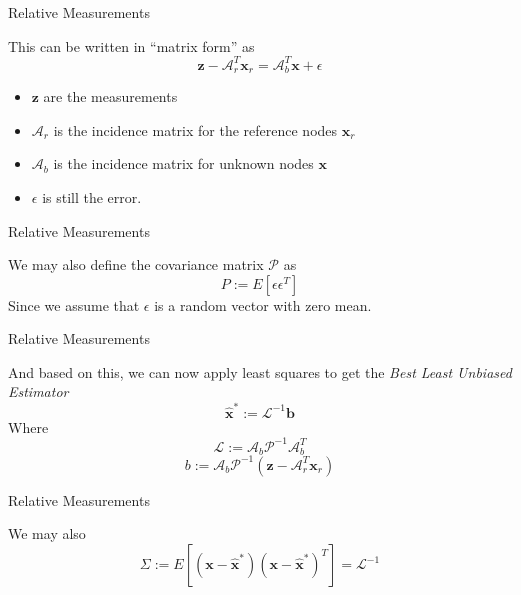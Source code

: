 \documentclass{beamer}
\begin{document}
\begin{frame}{Relative Measurements}
\begin{center}
This can be written in ``matrix form'' as
\[ \mathbf{z} - \mathcal{A}_r^T\mathbf{x}_r = \mathcal{A}_b^T \mathbf{x} +
 \epsilon \]
 \begin{itemize}
 \item $\mathbf{z}$ are the measurements
 \item $\mathcal{A}_r$ is the incidence
 matrix for the reference nodes $\mathbf{x}_r$
 \item $\mathcal{A}_b$ is the incidence
 matrix for unknown nodes $\mathbf{x}$ 
 \item $\epsilon$ is still the error.
 \end{itemize}
 \end{center}
 \end{frame}

 \begin{frame}{Relative Measurements}
 \begin{center}
 We may also define the covariance matrix $\mathcal{P}$ as
 \[ P := E[\epsilon \epsilon^T] \]
Since we assume that $\epsilon$ is a random vector with zero mean. 
\end{center}
\end{frame}

 \begin{frame}{Relative Measurements}
 \begin{center}
 And based on this, we can now apply least squares to get the \emph{Best Least
 Unbiased Estimator}
 \[ \hat{\mathbf{x}}^{*} := \mathcal{L}^{-1} \mathbf{b} \]
 Where
 \[ \mathcal{L} :=\mathcal{A}_b \mathcal{P}^{-1} \mathcal{A}_b^T \]
 \[ b := \mathcal{A}_b \mathcal{P}^{-1} \left( \mathbf{z} - \mathcal{A}_r^T
 \mathbf{x}_r \right ) \]
  \end{center}
\end{frame}

\begin{frame}{Relative Measurements}
\begin{center}
We may also
\[ \Sigma :=
 E[(\mathbf{x}-\hat{\mathbf{x}}^{*})(\mathbf{x}-\hat{\mathbf{x}}^{*})^T] =
 \mathcal{L}^{-1} \]
 \end{center}
 \end{frame}
\end{document}

